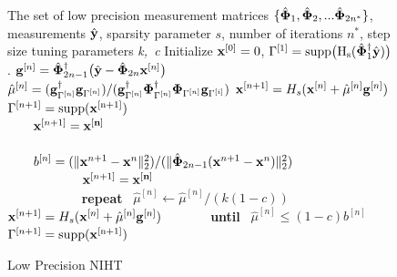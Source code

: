 \documentclass{article}
\begin{document}
\begin{figure}
\vspace{-2em}
\begin{algorithm}[H]
   \scriptsize
   \caption{Low Precision NIHT}
   \label{low_precision_iht}
\begin{algorithmic}
    The set of low precision measurement matrices $\{ \hat{\bf \Phi}_1, \hat{\bf \Phi}_2, ...\hat{\bf \Phi}_{2n^*}\}$, measurements $\hat{\bf y}$, sparsity parameter $s$, number of iterations $n^*$, step size tuning parameters {\it k,\ c} 
   \STATE Initialize ${\bf x}^{[0]} = 0$, $\Gamma^{[1]} = \rm{supp}\big (H_s(\hat{\bf \Phi}_1^{\dagger}{\hat{\bf y}})\big)$.
   \STATE ${\bf g}^{[n]} = {\hat{\bf \Phi}^{\dagger}}_{2n-1} \big(\hat{{\bf y}}-{\hat{\bf \Phi}}_{2n}{\bf x}^{[n]}\big)$
   \STATE $\hat{\bf \mu}^{[n]} = ({\bf g}^{\dagger}_{\Gamma^{[n]}}{\bf g}_{\Gamma^{[n]}})/({\bf g}^{\dagger}_{\Gamma^{[n]}}{\bf \Phi}^{\dagger}_{\Gamma^{[n]}}{\bf \Phi}_{\Gamma^{[n]}}{\bf g}_{\Gamma^{[i]}})$
   \STATE ${\bf x}^{[n+1]} = H_s({\bf x}^{[n]} + \hat{\bf \mu}^{[n]} {\bf g}^{[n]})$
   \STATE $\Gamma^{[n+1]} = \rm{supp}({\bf x}^{[n+1]})$\\
   \algorithmicif{  \ $\Gamma^{[n+1]}=\Gamma^{[n]}$}
   \STATE \ \ \ \ ${\bf x}^{[n+1]}=\bf{ x}^{[n]}$\\
   \algorithmicelse \ \algorithmicif{\ $\Gamma^{[n+1]}\neq \Gamma^{[n]}$}\\
   \STATE \ \ \ \ ${ b}^{[n]}=(\|{\bf x}^{n+1}-{\bf x}^{n} \|^2_2)/(\|\hat{\bf \Phi}_{2n-1}({\bf x}^{n+1}-{\bf x}^{n})\|^2_2)$\\
   \ \ \ \ 
   \STATE \ \ \ \ \ \ \ {${\bf x}^{[n+1]}=\bf {x}^{[n]}$}\\
   \ \ \ \ 
   \STATE \ \ \ \ \ \ \ {\bf repeat} \ {$\hat{\mu}^{[n]} \leftarrow \hat{\mu}^{[n]}/(k(1-c))$}
   \STATE \ \ \ \ \ \ \ ${\bf x}^{[n+1]} = H_s({\bf x}^{[n]} + \hat{\bf \mu}^{[n]} {\bf g}^{[n]})$
   \STATE \ \ \ \ \ \ \ {\bf until} \ {$\hat{\mu}^{[n]}\leq (1-{c})b^{[n]}$ }
   \STATE $\Gamma^{[n+1]} = \rm{supp}({\bf x}^{[n+1]})$
   \ENDFOR
\end{algorithmic}
\end{algorithm}
\end{figure}

\vspace{-0.5em}
\end{document}
